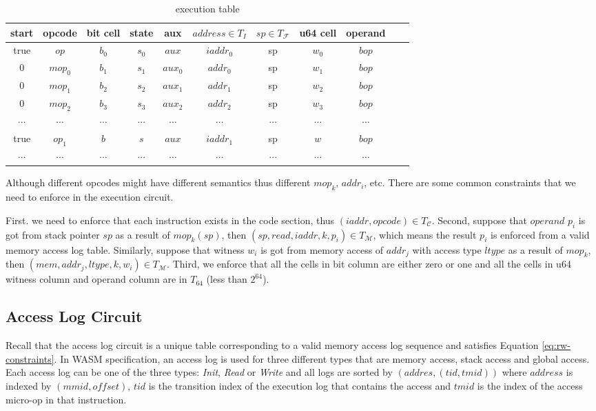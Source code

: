 \begin{table}[!h]
\begin{center}
\begin{tabular}{ | c | c | c | c | c | c | c | c | c | c | c | }
  \hline
  start & opcode & bit cell & state & aux & $address \in T_{I}$ & $sp \in T_\mathcal{F}$& u64 cell & operand \\ 
  \hline
   true & $op$ & $b_0$ & $s_0$ & $aux$ & $iaddr_0$ & sp & $w_0$ & $bop$\\ 
 \hline
   0 & $mop_0$ & $b_1$ & $s_1$ & $aux_0$ & $addr_0$ & sp & $w_1$ & $bop$\\ 
 \hline
   0 & $mop_1$ & $b_2$ & $s_2$ & $aux_1$ & $addr_1$ & sp & $w_2$ & $bop$\\ 
 \hline 
  0 & $mop_2$ & $b_3$ & $s_3$ & $aux_2$ & $addr_2$ & sp & $w_3$ & $bop$\\ 
 \hline
   $\cdots$ & $\cdots$ & $\cdots$ & $\cdots$ & $\cdots$ & $\cdots$ & $\cdots$ & $\cdots$ & $\cdots$\\ 
 \hline
   true & $op_1$ & $b$ & $s$ & $aux$ & $iaddr_1$ & sp & $w$ & $bop$\\ 
 \hline
   $\cdots$ & $\cdots$ & $\cdots$ & $\cdots$ & $\cdots$ & $\cdots$ & $\cdots$ & $\cdots$ & $\cdots$\\
 \hline
 \hline
\end{tabular}
\caption{execution table}
\label{tbl:ex-table}
\end{center}
\end{table}

Although different opcodes might have different semantics thus different $mop_k$, $addr_i$, etc. There are some common constraints that we need to enforce in the execution circuit.

First. we need to enforce that each instruction exists in the code section, thus $(iaddr, opcode) \in T_\mathcal{C}$. Second, suppose that $operand$ $p_i$ is got from stack pointer $sp$ as a result of $mop_k(sp)$, then $(sp, read, iaddr, k, p_i) \in T_{\mathcal{M}}$, which means the result $p_i$ is enforced from a valid memory access log table. Similarly, suppose that witness $w_i$ is got from memory access of $addr_j$ with access type $ltype$ as a result of $mop_k$, then $(mem, addr_j, ltype, k, w_i) \in T_{\mathcal{M}}$.  Third, we enforce that all the cells in bit column are either zero or one and all the cells in u64 witness column and operand column are in $T_64$ (less than $2^{64}$).
\subsection{Access Log Circuit}
\label{chp:access-log-circuit}
Recall that the access log circuit is a unique table corresponding to a valid memory access log sequence and satisfies Equation \ref{eq:rw-constraints}. In WASM specification, an access log is used for three different types that are memory access, stack access and global access. Each access log can be one of the three types: \emph{Init}, \emph{Read} or \emph{Write} and all logs are sorted by $(addres, (tid, tmid))$ where $address$ is indexed by $ (mmid, offset)$, $tid$ is the transition index of the execution log that contains the access and $tmid$ is the index of the access micro-op in that instruction.


